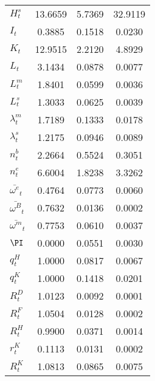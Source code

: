 \begin{center}
\begin{longtable}{lccc}
$ H^s_t                     $	 & 	      13.6659	 & 	       5.7369	 & 	      32.9119 \\ 
$ I_t                       $	 & 	       0.3885	 & 	       0.1518	 & 	       0.0230 \\ 
$ K_t                       $	 & 	      12.9515	 & 	       2.2120	 & 	       4.8929 \\ 
$ L_t                       $	 & 	       3.1434	 & 	       0.0878	 & 	       0.0077 \\ 
$ L^m_t                     $	 & 	       1.8401	 & 	       0.0599	 & 	       0.0036 \\ 
$ L^s_t                     $	 & 	       1.3033	 & 	       0.0625	 & 	       0.0039 \\ 
$ \lambda^m_t               $	 & 	       1.7189	 & 	       0.1333	 & 	       0.0178 \\ 
$ \lambda^s_t               $	 & 	       1.2175	 & 	       0.0946	 & 	       0.0089 \\ 
$ n^b_t                     $	 & 	       2.2664	 & 	       0.5524	 & 	       0.3051 \\ 
$ n^e_t                     $	 & 	       6.6004	 & 	       1.8238	 & 	       3.3262 \\ 
$ \bar{\omega^e}_t          $	 & 	       0.4764	 & 	       0.0773	 & 	       0.0060 \\ 
$ \bar{\omega^B}_t          $	 & 	       0.7632	 & 	       0.0136	 & 	       0.0002 \\ 
$ \bar{\omega^m}_t          $	 & 	       0.7753	 & 	       0.0610	 & 	       0.0037 \\ 
$ \PI                       $	 & 	       0.0000	 & 	       0.0551	 & 	       0.0030 \\ 
$ q^H_t                     $	 & 	       1.0000	 & 	       0.0817	 & 	       0.0067 \\ 
$  q^K_t                    $	 & 	       1.0000	 & 	       0.1418	 & 	       0.0201 \\ 
$  R^D_t                    $	 & 	       1.0123	 & 	       0.0092	 & 	       0.0001 \\ 
$ R^F_t                     $	 & 	       1.0504	 & 	       0.0128	 & 	       0.0002 \\ 
$   R^H_t                   $	 & 	       0.9900	 & 	       0.0371	 & 	       0.0014 \\ 
$ r^K_t                     $	 & 	       0.1113	 & 	       0.0131	 & 	       0.0002 \\ 
$  R^K_t                    $	 & 	       1.0813	 & 	       0.0865	 & 	       0.0075 \\ 

\end{longtable}
\end{center}
